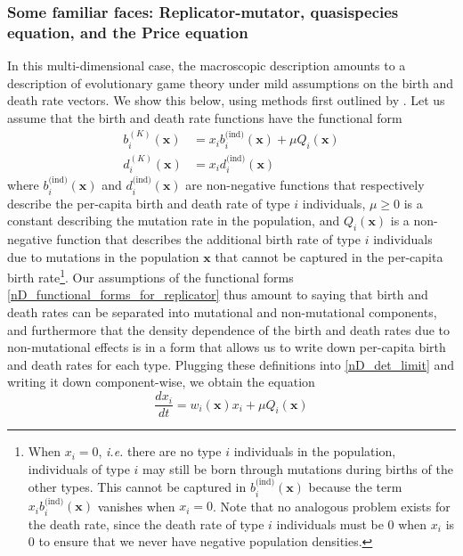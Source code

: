 \subsubsection{Some familiar faces: Replicator-mutator, quasispecies equation, and the Price equation}
In this multi-dimensional case, the macroscopic description amounts to a description of evolutionary game theory under mild assumptions on the birth and death rate vectors. We show this below, using methods first outlined by \citep{page_unifying_2002}. Let us assume that the birth and death rate functions have the functional form
\begin{equation}
\label{nD_functional_forms_for_replicator}
\begin{aligned}
b^{(K)}_i(\mathbf{x}) &= x_ib^{\textrm{(ind)}}_{i}(\mathbf{x}) + \mu Q_i(\mathbf{x})\\
d^{(K)}_i(\mathbf{x}) &= x_id^{\textrm{(ind)}}_i(\mathbf{x})
\end{aligned}
\end{equation}
where $b^{\textrm{(ind)}}_{i}(\mathbf{x})$ and $d^{\textrm{(ind)}}_{i}(\mathbf{x})$ are non-negative functions that respectively describe the per-capita birth and death rate of type $i$ individuals, $\mu \geq 0$ is a constant describing the mutation rate in the population, and $Q_i(\mathbf{x})$ is a non-negative function that describes the additional birth rate of type $i$ individuals due to mutations in the population $\mathbf{x}$ that cannot be captured in the per-capita birth rate\footnote{When $x_i = 0$, \emph{i.e.} there are no type $i$ individuals in the population, individuals of type $i$ may still be born through mutations during births of the other types. This cannot be captured in $b^{\textrm{(ind)}}_{i}(\mathbf{x})$ because the term $x_ib^{\textrm{(ind)}}_{i}(\mathbf{x})$ vanishes when $x_i = 0$. Note that no analogous problem exists for the death rate, since the death rate of type $i$ individuals must be 0 when $x_i$ is 0 to ensure that we never have negative population densities.}. Our assumptions of the functional forms \eqref{nD_functional_forms_for_replicator} thus amount to saying that birth and death rates can be separated into mutational and non-mutational components, and furthermore that the density dependence of the birth and death rates due to non-mutational effects is in a form that allows us to write down per-capita birth and death rates for each type. Plugging these definitions into \eqref{nD_det_limit} and writing it down component-wise, we obtain the equation
\begin{equation}
\label{nD_det_limit_fitess_defn}
\frac{dx_i}{dt} = w_i(\mathbf{x})x_i + \mu Q_i(\mathbf{x})
\end{equation}
